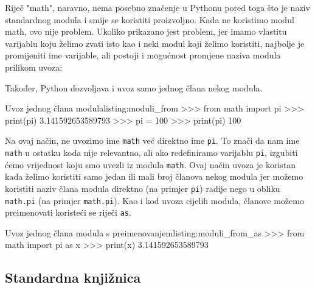Riječ "math", naravno, nema posebno značenje u Pythonu pored toga što je naziv standardnog modula i smije se koristiti proizvoljno. Kada ne koristimo modul math, ovo nije problem. Ukoliko prikazano jest problem, jer imamo vlastitu varijablu koju želimo zvati isto kao i neki modul koji želimo koristiti, najbolje je promijeniti ime varijable, ali postoji i mogućnost promjene naziva modula prilikom uvoza:


Također, Python dozvoljava i uvoz samo jednog člana nekog modula.

\begin{python}{Uvoz jednog člana modula}{listing:moduli_from}
>>> from math import pi
>>> print(pi)
3.141592653589793
>>> pi = 100
>>> print(pi)
100
\end{python}

Na ovaj način, ne uvozimo ime \texttt{math} već direktno ime \texttt{pi}. To znači da nam ime \texttt{math} u ostatku koda nije relevantno, ali ako redefiniramo varijablu \texttt{pi}, izgubiti ćemo vrijednost koju smo uvezli iz modula \texttt{math}. Ovaj način uvoza je koristan kada želimo koristiti samo jedan ili mali broj članova nekog modula jer možemo koristiti naziv člana modula direktno (na primjer \texttt{pi}) radije nego u obliku \texttt{math.pi} (na primjer \texttt{math.pi}). Kao i kod uvoza cijelih modula, članove možemo preimenovati koristeći se riječi \texttt{as}.

\begin{python}{Uvoz jednog člana modula s preimenovanjem}{listing:moduli_from_as}
>>> from math import pi as x
>>> print(x)
3.141592653589793
\end{python}

\subsection{Standardna knjižnica}


